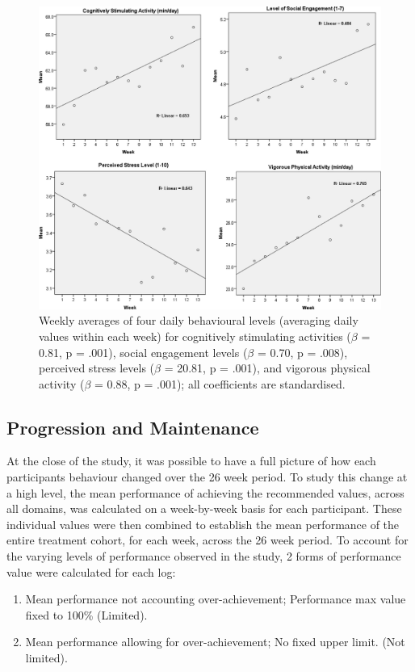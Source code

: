  \begin{figure}[h]
    \centering
    \includegraphics[scale=0.25, angle=0]{Files/prevention-study-3/figures/behaviourchange-week14}
    \caption{Weekly averages of four daily behavioural levels (averaging daily values within each week) for cognitively stimulating activities ($\beta$ = 0.81, p = .001), social engagement levels ($\beta$ = 0.70, p = .008), perceived stress levels ($\beta$ = 20.81, p = .001), and vigorous physical activity ($\beta$ = 0.88, p = .001); all coefficients are standardised.}
    \label{fig: preliminary-analysis}
\end{figure}

\subsection{Progression and Maintenance}
At the close of the study, it was possible to have a full picture of how each participants behaviour changed over the 26 week period.
To study this change at a high level, the mean performance of achieving the recommended values, across all domains, was calculated on a week-by-week basis for each participant. These individual values were then combined to establish the mean performance of the entire treatment cohort, for each week, across the 26 week period. To account for the varying levels of performance observed in the study, 2 forms of performance value were calculated for each log:

\begin{enumerate}[noitemsep,topsep=0pt]
\item Mean performance not accounting over-achievement; Performance max value fixed to 100\% (Limited).
\item Mean performance allowing for over-achievement; No fixed upper limit. (Not limited).
\end{enumerate}

